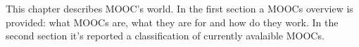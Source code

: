 This chapter describes MOOC’s world.
In the first section a MOOCs overview is provided: what MOOCs are, what they are for and how do they work. In the second section it’s reported a classification of currently avalaible MOOCs.
  